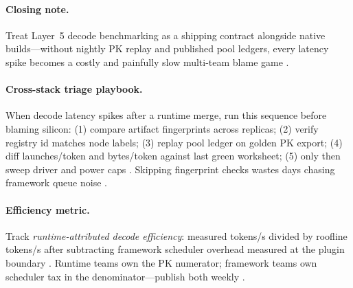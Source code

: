 \paragraph{Closing note.} Treat Layer~5 decode benchmarking as a shipping contract alongside native builds---without nightly PK replay and published pool ledgers, every latency spike becomes a costly and painfully slow multi-team blame game \citep{yirage2026,patel2025llminference,chen2020compilerbasedhardw,memoryfloor2026,taxbreak2026,kwon2023vllm,liu2024deepseekv3,nvidia2024cudagraphs,dao2022flashattention,amd2024xdna,amd2024aie,dao2023flashdecoding,nvidia2022hopper,semianalysis2024tma,dlbook}.


\paragraph{Cross-stack triage playbook.} When decode latency spikes after a runtime merge, run this sequence before blaming silicon: (1) compare artifact fingerprints across replicas; (2) verify registry id matches node labels; (3) replay pool ledger on golden PK export; (4) diff launches/token and bytes/token against last green worksheet; (5) only then sweep driver and power caps \citep{yirage2026,chen2020compilerbasedhardw,patel2025llminference,taxbreak2026,memoryfloor2026,kwon2023vllm,liu2024deepseekv3,nvidia2024cudagraphs,dao2022flashattention,amd2024xdna,amd2024aie,dao2023flashdecoding,nvidia2022hopper,semianalysis2024tma,dlbook}. Skipping fingerprint checks wastes days chasing framework queue noise \citep{patel2025llminference,yirage2026,chen2020compilerbasedhardw,kwon2023vllm,memoryfloor2026,taxbreak2026,liu2024deepseekv3,nvidia2024cudagraphs,dao2022flashattention,amd2024aie,amd2024xdna,dao2023flashdecoding,nvidia2022hopper,semianalysis2024tma,dlbook}.

\paragraph{Efficiency metric.} Track \emph{runtime-attributed decode efficiency}: measured tokens/s divided by roofline tokens/s after subtracting framework scheduler overhead measured at the plugin boundary \citep{patel2025llminference,yirage2026,chen2020compilerbasedhardw,memoryfloor2026,taxbreak2026,kwon2023vllm,liu2024deepseekv3,nvidia2024cudagraphs,dao2022flashattention,amd2024xdna,amd2024aie,dao2023flashdecoding,nvidia2022hopper,semianalysis2024tma,dlbook}. Runtime teams own the PK numerator; framework teams own scheduler tax in the denominator---publish both weekly \citep{yirage2026,patel2025llminference,chen2020compilerbasedhardw,kwon2023vllm,memoryfloor2026,taxbreak2026,liu2024deepseekv3,nvidia2024cudagraphs,dao2022flashattention,amd2024aie,amd2024xdna,dao2023flashdecoding,nvidia2022hopper,semianalysis2024tma,dlbook}.


